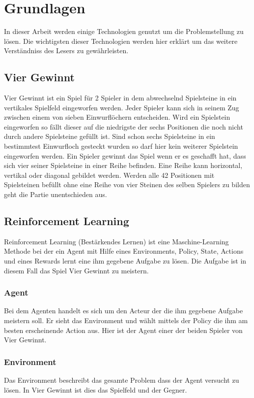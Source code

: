 \chapter{Grundlagen}%

\label{cha:Schluss}

In dieser Arbeit werden einige Technologien genutzt um die Problemstellung zu lösen.
Die wichtigsten dieser Technologien werden hier erklärt um das weitere Verständniss des Lesers zu gewährleisten. 


\section{Vier Gewinnt}
Vier Gewinnt ist ein Spiel für 2 Spieler in dem abwechselnd Spielsteine in ein vertikales Spielfeld eingeworfen werden. Jeder Spieler kann sich in seinem Zug zwischen einem von sieben Einwurflöchern entscheiden. Wird ein Spielstein eingeworfen so fällt dieser auf die niedrigste der sechs Positionen die noch nicht durch andere Spielsteine gefüllt ist. Sind schon sechs Spielsteine in ein bestimmtest Einwurfloch gesteckt wurden so darf hier kein weiterer Spielstein eingeworfen werden. Ein Spieler gewinnt das Spiel wenn er es geschafft  hat, dass sich vier seiner Spielsteine in einer Reihe befinden. Eine Reihe kann horizontal, vertikal oder diagonal gebildet werden. Werden alle 42 Positionen mit Spielsteinen befüllt ohne eine Reihe von vier Steinen des selben Spielers zu bilden geht die Partie unentschieden aus.

\section{Reinforcement Learning}
Reinforcement Learning (Bestärkendes Lernen) ist eine Maschine-Learning Methode bei der ein Agent mit Hilfe eines Environments, Policy, State, Actions und eines Rewards lernt eine ihm gegebene Aufgabe zu lösen.
Die Aufgabe ist in diesem Fall das Spiel Vier Gewinnt zu meistern.

\subsection{Agent}
Bei dem Agenten handelt es sich um den Acteur der die ihm gegebene Aufgabe meistern soll. Er sieht das Environment und wählt mittels der Policy die ihm am besten erscheinende Action aus.
Hier ist der Agent einer der beiden Spieler von Vier Gewinnt.

\subsection{Environment}
Das Environment beschreibt das gesamte Problem dass der Agent versucht zu lösen.
In Vier Gewinnt ist dies das Spielfeld und der Gegner. 

